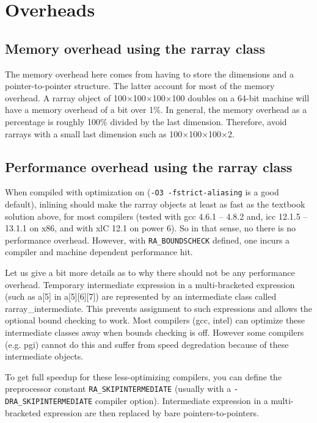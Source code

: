 \documentclass[11pt,twoside]{article}
\begin{document}
\section{Overheads}

\subsection{Memory overhead using the rarray class}

The memory overhead here comes from having to store the dimensions and a pointer-to-pointer structure.  The latter account for most of the memory overhead.   A rarray object of 100$\times$100$\times$100$\times$100  doubles on a 64-bit machine will have a memory overhead of a bit over 1\%. In general, the memory overhead as a percentage is roughly 100\% divided by the last dimension. Therefore, avoid rarrays with a small last dimension such as 100$\times$100$\times$100$\times$2.

\subsection{Performance overhead using the rarray class}

When compiled with optimization on (\texttt{-O3 -fstrict-aliasing} is a good default), inlining should make the rarray objects at least as fast as the textbook solution above, for most compilers (tested with gcc 4.6.1 -- 4.8.2 and, icc 12.1.5 -- 13.1.1 on x86, and with xlC 12.1 on power 6).
So in that sense, no there is no performance overhead.  However, with \texttt{{\tt RA\_BOUNDSCHECK}} defined, one incurs a compiler and machine dependent performance hit.

Let us give a bit more details as to why there should not be any performance overhead. Temporary intermediate expression in a multi-bracketed expression (such as a[5] in a[5][6][7]) are represented by an intermediate class called rarray\_intermediate. This prevents assignment to such expressions and allows the optional bound checking to work.  Most compilers (gcc, intel) can optimize these intermediate classes away when bounds checking is off. However
some compilers (e.g. pgi) cannot do this and suffer from speed degredation because of these intermediate objects.

To get full speedup for these less-optimizing compilers, you can define the preprocessor constant \texttt{RA\_SKIPINTERMEDIATE} (usually with a \texttt{-DRA\_SKIPINTERMEDIATE} compiler option).  Intermediate expression in a multi-bracketed expression are then replaced by bare pointers-to-pointers.
\end{document}
